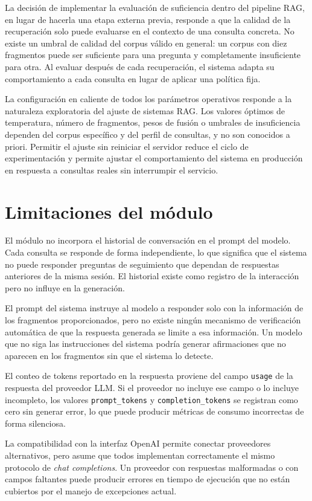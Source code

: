 \documentclass[11pt]{article}
\begin{document}
La decisión de implementar la evaluación de suficiencia dentro del pipeline RAG, en lugar de
hacerla una etapa externa previa, responde a que la calidad de la recuperación solo puede
evaluarse en el contexto de una consulta concreta. No existe un umbral de calidad del corpus
válido en general: un corpus con diez fragmentos puede ser suficiente para una pregunta y
completamente insuficiente para otra. Al evaluar después de cada recuperación, el sistema
adapta su comportamiento a cada consulta en lugar de aplicar una política fija.

La configuración en caliente de todos los parámetros operativos responde a la naturaleza
exploratoria del ajuste de sistemas RAG. Los valores óptimos de temperatura, número de
fragmentos, pesos de fusión o umbrales de insuficiencia dependen del corpus específico y del
perfil de consultas, y no son conocidos a priori. Permitir el ajuste sin reiniciar el servidor
reduce el ciclo de experimentación y permite ajustar el comportamiento del sistema en producción
en respuesta a consultas reales sin interrumpir el servicio.

\section{Limitaciones del módulo}

El módulo no incorpora el historial de conversación en el prompt del modelo. Cada consulta
se responde de forma independiente, lo que significa que el sistema no puede responder
preguntas de seguimiento que dependan de respuestas anteriores de la misma sesión. El historial
existe como registro de la interacción pero no influye en la generación.

El prompt del sistema instruye al modelo a responder solo con la información de los fragmentos
proporcionados, pero no existe ningún mecanismo de verificación automática de que la respuesta
generada se limite a esa información. Un modelo que no siga las instrucciones del sistema
podría generar afirmaciones que no aparecen en los fragmentos sin que el sistema lo detecte.

El conteo de tokens reportado en la respuesta proviene del campo \texttt{usage} de la respuesta
del proveedor LLM. Si el proveedor no incluye ese campo o lo incluye incompleto, los valores
\texttt{prompt\_tokens} y \texttt{completion\_tokens} se registran como cero sin generar error,
lo que puede producir métricas de consumo incorrectas de forma silenciosa.

La compatibilidad con la interfaz OpenAI permite conectar proveedores alternativos, pero
asume que todos implementan correctamente el mismo protocolo de \emph{chat completions}. Un
proveedor con respuestas malformadas o con campos faltantes puede producir errores en tiempo
de ejecución que no están cubiertos por el manejo de excepciones actual.
\end{document}

